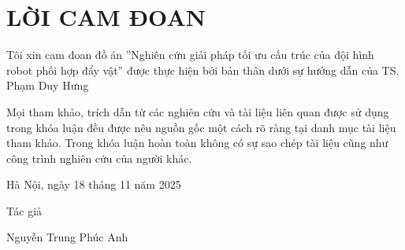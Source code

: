 \chapter*{LỜI CAM ĐOAN}
\fontsize{13}{15}\selectfont
Tôi xin cam đoan đồ án ''Nghiên cứu giải pháp tối ưu cấu trúc của đội hình robot phối hợp đẩy vật'' được thực hiện bởi bản thân dưới sự hướng dẫn của TS. Phạm Duy Hưng

Mọi tham khảo, trích dẫn từ các nghiên cứu và tài liệu liên quan được sử dụng trong khóa luận đều được nêu nguồn gốc một cách rõ ràng tại danh mục tài liệu tham khảo. Trong khóa luận hoàn toàn không có sự sao chép tài liệu cũng như công trình nghiên cứu của người khác.

\vspace{0.5cm}

\begin{flushright}
    Hà Nội, ngày 18 tháng 11 năm 2025 \par
    Tác giả\hspace*{2.8cm}\par
    \vspace{1.5cm}
    Nguyễn Trung Phúc Anh\hspace*{1.4cm}
\end{flushright}